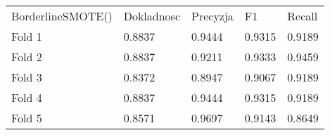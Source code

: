 \begin{tabular}{lllll}
\hline
 BorderlineSMOTE() & Dokladnosc & Precyzja & F1     & Recall \\
 Fold 1            & 0.8837     & 0.9444   & 0.9315 & 0.9189 \\
 Fold 2            & 0.8837     & 0.9211   & 0.9333 & 0.9459 \\
 Fold 3            & 0.8372     & 0.8947   & 0.9067 & 0.9189 \\
 Fold 4            & 0.8837     & 0.9444   & 0.9315 & 0.9189 \\
 Fold 5            & 0.8571     & 0.9697   & 0.9143 & 0.8649 \\
\hline
\end{tabular}